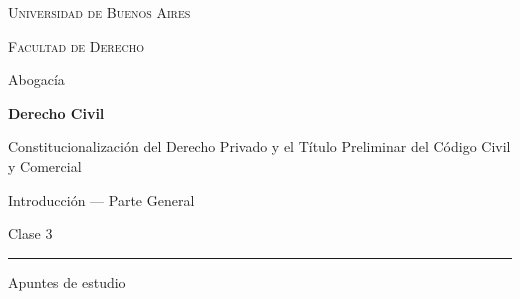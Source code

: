 \documentclass[12pt,oneside]{book}
\newcommand{\universidad}{Universidad de Buenos Aires}
\newcommand{\facultad}{Facultad de Derecho}
\newcommand{\departamento}{Abogacía}
\newcommand{\materia}{Derecho Civil}
\newcommand{\titulo}{Constitucionalización del Derecho Privado y el Título Preliminar del Código Civil y Comercial}
\newcommand{\parte}{Introducción --- Parte General}
\newcommand{\numeroclase}{Clase 3}
\begin{document}

\begin{titlepage}

\thispagestyle{empty}

\begin{center}

\vspace*{1cm}

%

\vspace{1cm}

{\large \textsc{\universidad}}

\vspace{0.2cm}

{\large \textsc{\facultad}}

\vspace{0.2cm}

{\large \departamento}

\vspace{1cm}

{\Huge \textbf{\materia}}

\vspace{1cm}

{\LARGE \titulo}

\end{center}

\begin{flushright}

    \vspace{0.8cm}

    {\large \parte}

    \vspace{0.2cm}

    {\large \numeroclase}

    \vspace{1cm}

    \rule{0.70\textwidth}{0.5pt}

    \vspace{0.5cm}

    {\large Apuntes de estudio}

    \vspace{0.5cm}


\end{flushright}
\end{titlepage}
\end{document}
